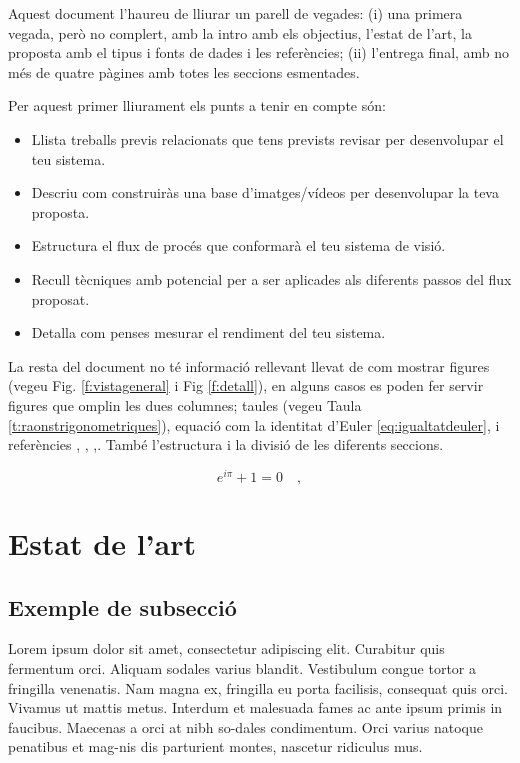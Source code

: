 ﻿\documentclass[10pt,a4paper,twocolumn,twoside]{article}
\begin{document}
Aquest document l’haureu de lliurar un parell de vegades: (i) una primera vegada, però no complert, amb la intro amb els objectius, l'estat de l'art, la proposta amb el tipus i fonts de dades i les referències; (ii) l'entrega final, amb no més de quatre pàgines amb totes les seccions esmentades.

Per aquest primer lliurament els punts a tenir en compte són:

\begin{itemize}
\item	Llista treballs previs relacionats que tens prevists revisar per desenvolupar el teu sistema.
\item	Descriu com construiràs una base d’imatges/vídeos per desenvolupar la teva proposta.
\item	Estructura el flux de procés que conformarà el teu sistema de visió.
\item	Recull tècniques amb potencial per a ser aplicades als diferents passos del flux proposat.
\item	Detalla com penses mesurar el rendiment del teu sistema.
\end{itemize}

La resta del document no té informació rellevant llevat de com mostrar figures (vegeu Fig. \ref{f:vistageneral} i Fig \ref{f:detall}), en alguns casos es poden fer servir figures que omplin les dues columnes; taules (vegeu Taula \ref{t:raonstrigonometriques}), equació com la identitat d’Euler \ref{eq:igualtatdeuler}, i referències\cite{Russakovskyet2015} ,\cite{Krizhevsky2012} ,
\cite{Simonyan2014} ,\cite{Szegedyet2015}. També l’estructura i la divisió de les diferents seccions.



\begin{equation}
 e^{i\pi}+1=0 \quad,
\label{eq:igualtatdeuler}
\end{equation}

\section{Estat de l'art}

\subsection{Exemple de subsecció}

Lorem ipsum dolor sit amet, consectetur adipiscing elit. Curabitur quis fermentum orci. Aliquam sodales varius blandit. Vestibulum congue tortor a fringilla venenatis. Nam magna ex, fringilla eu porta facilisis, consequat quis orci. Vivamus ut mattis metus. Interdum et malesuada fames ac ante ipsum primis in faucibus. Maecenas a orci at nibh so-dales condimentum. Orci varius natoque penatibus et mag-nis dis parturient montes, nascetur ridiculus mus. 
\end{document}
